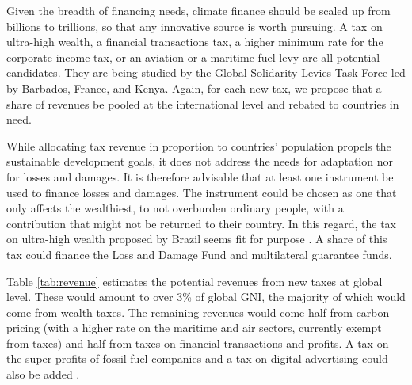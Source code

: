 \documentclass[12pt,english]{article}
\begin{document}
\begin{bibunit}
Given the breadth of financing needs, climate finance should be scaled up from billions to trillions, so that any innovative source is worth pursuing. A tax on ultra-high wealth, a financial transactions tax, a higher minimum rate for the corporate income tax, or an aviation or a maritime fuel levy are all potential candidates. They are being studied by the Global Solidarity Levies Task Force led by Barbados, France, and Kenya. Again, for each new tax, we propose that a share of revenues be pooled at the international level and rebated to countries in need. 

While allocating tax revenue in proportion to countries' population propels the sustainable development goals, it does not address the needs for adaptation nor for losses and damages. It is therefore advisable that at least one instrument be used to finance losses and damages. The instrument could be chosen as one that only affects the wealthiest, to not overburden ordinary people, with a contribution that might not be returned to their country. In this regard, the tax on ultra-high wealth proposed by Brazil seems fit for purpose \citep{zucman_blueprint_2024}. A share of this tax could finance the Loss and Damage Fund and multilateral guarantee funds. 

Table \ref{tab:revenue} estimates the potential revenues from new taxes at global level. These would amount to over 3\% of global GNI, the majority of which would come from wealth taxes. The remaining revenues would come half from carbon pricing (with a higher rate on the maritime and air sectors, currently exempt from taxes) and half from taxes on financial transactions and profits. A tax on the super-profits of fossil fuel companies and a tax on digital advertising could also be added \citep{acemoglu_urgent_2024}. 


\end{bibunit}
\end{document}
